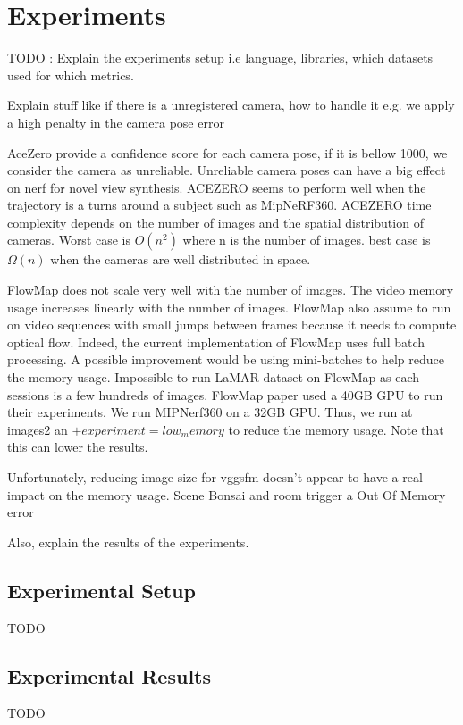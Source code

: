 \chapter{Experiments}\label{chap:experiments}

TODO : 
Explain the experiments setup i.e language, libraries, which datasets used for which metrics. 

Explain stuff like if there is a unregistered camera, how to handle it e.g. we apply a high penalty in the camera pose error

AceZero provide a confidence score for each camera pose, if it is bellow 1000, we consider the camera as unreliable.
Unreliable camera poses can have a big effect on nerf for novel view synthesis.
ACEZERO seems to perform well when the trajectory is a turns around a subject such as MipNeRF360.
ACEZERO time complexity depends on the number of images and the spatial distribution of cameras. Worst case is $O(n^2)$ where n is the number of images. best case is $\Omega(n)$ when the cameras are well distributed in space.

FlowMap does not scale very well with the number of images. The video memory usage increases linearly with the number of images.
FlowMap also assume to run on video sequences with small jumps between frames because it needs to compute optical flow.
Indeed, the current implementation of FlowMap uses full batch processing. A possible improvement would be using mini-batches to help reduce the memory usage.
Impossible to run LaMAR dataset on FlowMap as each sessions is a few hundreds of images.
FlowMap paper used a 40GB GPU to run their experiments. We run MIPNerf360 on a 32GB GPU. Thus, we run at images2 an $+experiment=low_memory$ to reduce the memory usage. Note that this can lower the results.


Unfortunately, reducing image size for vggsfm doesn't appear to have a real impact on the memory usage. Scene Bonsai and room trigger a Out Of Memory error


Also, explain the results of the experiments.

\section{Experimental Setup}\label{sec:experimental-setup}
TODO

\section{Experimental Results}\label{sec:experimental-results}
TODO